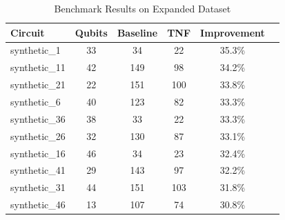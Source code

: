 \begin{table}[t]
\centering
\caption{Benchmark Results on Expanded Dataset}
\begin{tabular}{lccccc}
\toprule
Circuit & Qubits & Baseline & TNF & Improvement \\
\midrule
synthetic_1 & 33 & 34 & 22 & 35.3\% \\
synthetic_11 & 42 & 149 & 98 & 34.2\% \\
synthetic_21 & 22 & 151 & 100 & 33.8\% \\
synthetic_6 & 40 & 123 & 82 & 33.3\% \\
synthetic_36 & 38 & 33 & 22 & 33.3\% \\
synthetic_26 & 32 & 130 & 87 & 33.1\% \\
synthetic_16 & 46 & 34 & 23 & 32.4\% \\
synthetic_41 & 29 & 143 & 97 & 32.2\% \\
synthetic_31 & 44 & 151 & 103 & 31.8\% \\
synthetic_46 & 13 & 107 & 74 & 30.8\% \\
\bottomrule
\end{tabular}
\end{table}